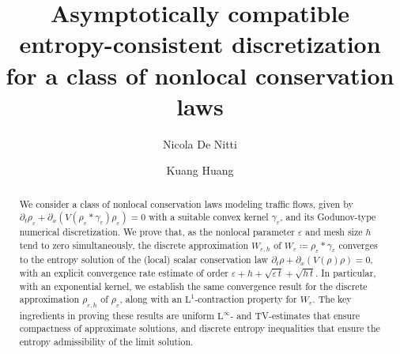 \documentclass[10pt]{amsart}
\theoremstyle{plain}
\theoremstyle{definition}
\numberwithin{equation}{section}
\newcommand{\eps}{{\varepsilon}}
\begin{document}


\title[Nonlocal AC Schemes]{Asymptotically compatible entropy-consistent discretization for a class of nonlocal conservation laws}


\author[N.~De Nitti]{Nicola De Nitti}
\address[N.~De Nitti]{Università di Pisa, Dipartimento di Matematica, Largo Bruno Pontecorvo 5, 56127 Pisa, Italy.}

\author[K.~Huang]{Kuang Huang}
\address[K.~Huang]{The Chinese University of Hong Kong, Department of Mathematics, Shatin, New Territories, Hong Kong SAR, P.\,R.~China.}






\begin{abstract}
We consider a class of nonlocal conservation laws modeling traffic flows, given by
\( \partial_t \rho_\eps + \partial_x(V(\rho_\eps \ast \gamma_\eps) \rho_\eps) = 0\) with a suitable convex kernel $\gamma_\eps$, and its Godunov-type numerical discretization. We prove that, as the nonlocal parameter $\eps$ and mesh size $h$ tend to zero simultaneously, the discrete approximation $W_{\eps,h}$ of $W_\eps \coloneqq \rho_\eps \ast \gamma_\eps$ converges to the entropy solution of the (local) scalar conservation law \( \partial_t \rho + \partial_x(V(\rho) \rho) = 0\), with an explicit convergence rate estimate of order $\eps+h+\sqrt{\eps\, t}+\sqrt{h\,t}$. In particular, with an exponential kernel, we establish the same convergence result for the discrete approximation $\rho_{\eps,h}$ of $\rho_\eps$, along with an $\mathrm{L}^1$-contraction property for $W_\eps$. The key ingredients in proving these results are uniform $\mathrm{L}^\infty$- and TV-estimates that ensure compactness of approximate solutions, and discrete entropy inequalities that ensure the entropy admissibility of the limit solution.
\end{abstract}
\end{document}
